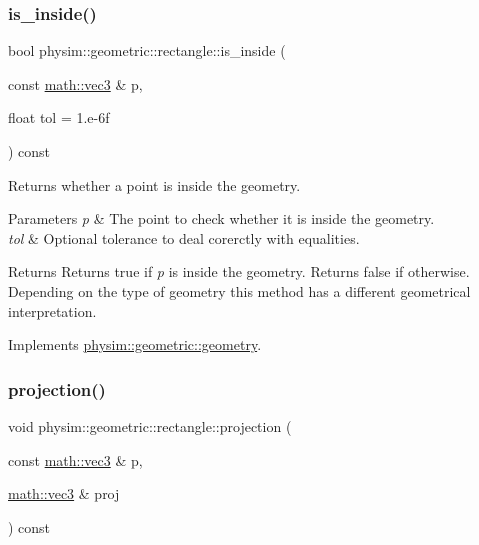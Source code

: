 \subsubsection{\texorpdfstring{is\+\_\+inside()}{is\_inside()}}
{\footnotesize\ttfamily bool physim\+::geometric\+::rectangle\+::is\+\_\+inside (\begin{DoxyParamCaption}\item[{const \hyperlink{structphysim_1_1math_1_1vec3}{math\+::vec3} \&}]{p,  }\item[{float}]{tol = {\ttfamily 1.e-\/6f} }\end{DoxyParamCaption}) const\hspace{0.3cm}{\ttfamily [virtual]}}



Returns whether a point is inside the geometry. 


\begin{DoxyParams}{Parameters}
{\em p} & The point to check whether it is inside the geometry. \\
\hline
{\em tol} & Optional tolerance to deal corerctly with equalities. \\
\hline
\end{DoxyParams}
\begin{DoxyReturn}{Returns}
Returns true if {\itshape p} is inside the geometry. Returns false if otherwise. Depending on the type of geometry this method has a different geometrical interpretation. 
\end{DoxyReturn}


Implements \hyperlink{classphysim_1_1geometric_1_1geometry_a325d4049d4e14584b389a2f1202bdc08}{physim\+::geometric\+::geometry}.

\mbox{\label{classphysim_1_1geometric_1_1rectangle_a27ae9df28df346dedfbc3500b79123cb}} 
\subsubsection{\texorpdfstring{projection()}{projection()}}
{\footnotesize\ttfamily void physim\+::geometric\+::rectangle\+::projection (\begin{DoxyParamCaption}\item[{const \hyperlink{structphysim_1_1math_1_1vec3}{math\+::vec3} \&}]{p,  }\item[{\hyperlink{structphysim_1_1math_1_1vec3}{math\+::vec3} \&}]{proj }\end{DoxyParamCaption}) const}



